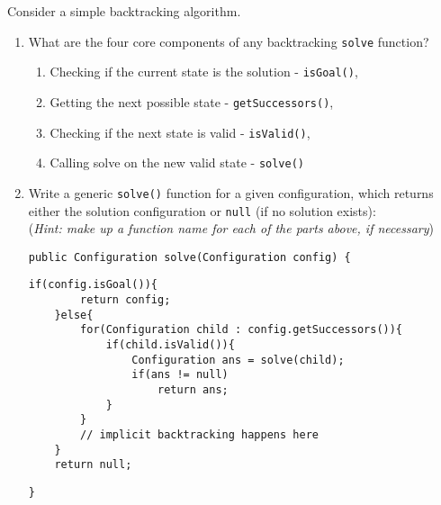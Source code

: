 Consider a simple backtracking algorithm.

\begin{enumerate}
\item What are the four core components of any backtracking \texttt{solve} function?

\begin{answer}
\begin{enumerate}
\item
Checking if the current state is the solution - \texttt{isGoal()}, 
\item
Getting the next possible state - \texttt{getSuccessors()}, 
\item
Checking if the next state is valid - \texttt{isValid()}, 
\item
Calling solve on the new valid state - \texttt{solve()}
\end{enumerate}
\end{answer}

\item Write a generic \texttt{solve()} function for a given configuration, which returns either the solution configuration or \texttt{null} (if no solution exists): \\
(\textit{Hint: make up a function name for each of the parts above, if necessary})
\vspace{.25in}
\begin{lstlisting}[numbers=none]
public Configuration solve(Configuration config) {
\end{lstlisting}
\begin{answer}
\begin{lstlisting}[numbers=none]
	if(config.isGoal()){
		return config;
	}else{
		for(Configuration child : config.getSuccessors()){
			if(child.isValid()){
				Configuration ans = solve(child);
				if(ans != null)
					return ans;
			}
		}
		// implicit backtracking happens here
	}
	return null;
\end{lstlisting}
\end{answer}
\begin{lstlisting}[numbers=none]
}
\end{lstlisting}
\end{enumerate}
